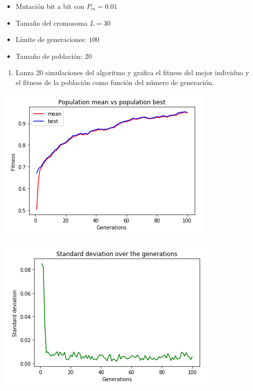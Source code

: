 \documentclass[10pt,letterpaper]{article}
\begin{document}
\begin{enumerate}
\begin{itemize}
            \item Mutación bit a bit con $P_m = 0.01$
            \item Tamaño del cromosoma $L= 30$
            \item Límite de generaciones: $100$
            \item Tamaño de población: $20$
        \end{itemize}
        \begin{enumerate}
            \item Lanza 20 simulaciones del algoritmo y grafica el fitness del mejor
                  individuo y el fitness de la población como función del número de
                  generación.
        \end{enumerate}
        \begin{multicols}{2}
            \begin{center}\includegraphics[scale=0.5]{./assets/ex2_mean.png}\end{center}
            \begin{center}\includegraphics[scale=0.5]{./assets/ex2_std.png}\end{center}

\end{multicols}
\end{enumerate}
\end{document}

